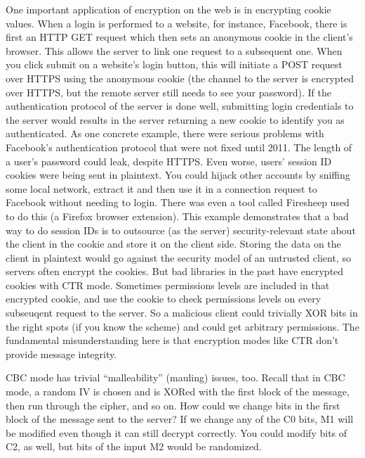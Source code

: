 \begin{example} One important application of encryption on the web is in encrypting cookie values. When a login is performed to a website, for instance, Facebook, there is first an HTTP GET request which then sets an anonymous cookie in the client's browser. This allows the server to link one request to a subsequent one. 
When you click submit on a website's login button, this will initiate a POST request over HTTPS using the anonymous cookie (the channel to the server is encrypted over HTTPS, but the remote server still needs to see your password). If the authentication protocol of the server is done well, submitting login credentials to the server would results in the server returning a new cookie to identify you as authenticated. 
As one concrete example, there were serious problems with Facebook's authentication protocol that were not fixed until 2011. 
The length of a user's password could leak, despite HTTPS.
Even worse, users' session ID cookies were being sent in plaintext. You could hijack other accounts by sniffing some local network, extract it and then use it in a connection request to Facebook without needing to login. There was even a tool called Firesheep used to do this (a Firefox browser extension).
This example demonstrates that a bad way to do session IDs is to outsource (as the server) security-relevant state about the client in the cookie and store it on the client side. Storing the data on the client in plaintext would go against the security model of an untrusted client, so servers often encrypt the cookies. But bad libraries in the past have encrypted cookies with CTR mode. Sometimes permissions levels are included in that encrypted cookie, and use the cookie to check permissions levels on every subseuqent request to the server. So a malicious client could trivially XOR bits in the right spots (if you know the scheme) and could get arbitrary permissions. The fundamental misunderstanding here is that encryption modes like CTR don't provide message integrity.
\end{example}

CBC mode has trivial ``malleability'' (mauling) issues, too. Recall that in CBC mode, a random IV is chosen and is XORed with the first block of the message, then run through the cipher, and so on. %
How could we change bits in the first block of the message sent to the server? %
If we change any of the C0 bits, M1 will be modified even though it can still decrypt correctly. You could modify bits of C2, as well, but bits of the input M2 would be randomized.%

